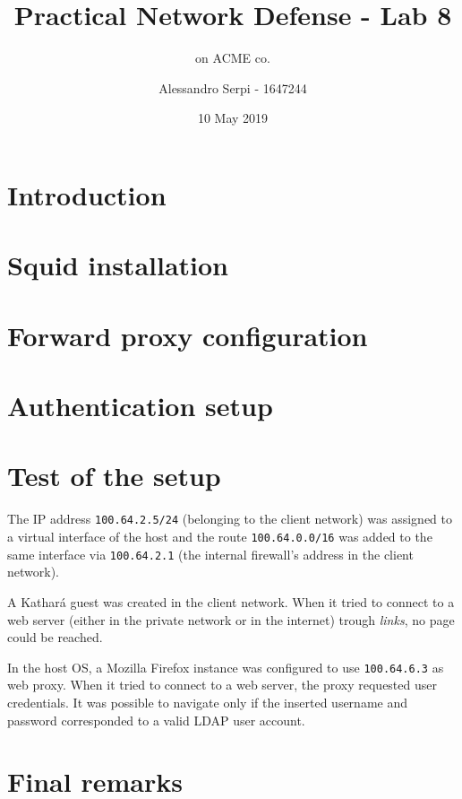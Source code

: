 \documentclass[draft]{homework}
\title{Practical Network Defense - Lab 8}
\subtitle{\sq on ACME co.}
\author{Alessandro Serpi - 1647244}
\date{10 May 2019}
\newcommand{\kat}{Kathará\xspace}
\newcommand{\sq}{Squid\xspace}
\begin{document}
    \maketitle
    \tableofcontents
    
    
    \pagebreak
    \section{Introduction}
    
    
    \section{\sq installation}
    
    
    \section{Forward proxy configuration}
    
    
    \section{Authentication setup}
    
    
    \section{Test of the setup}
    The IP address \texttt{100.64.2.5/24} (belonging to the client network) was assigned to a virtual interface of the host and the route \texttt{100.64.0.0/16} was added to the same interface via \texttt{100.64.2.1} (the internal firewall's address in the client network).
    
    A \kat guest was created in the client network.
    When it tried to connect to a web server (either in the private network or in the internet) trough \textit{links}, no page could be reached.
    
    In the host OS, a Mozilla Firefox instance was configured to use \texttt{100.64.6.3} as web proxy.
    When it tried to connect to a web server, the proxy requested user credentials.
    It was possible to navigate only if the inserted username and password corresponded to a valid LDAP user account.
    
    
    \section{Final remarks}
\end{document}
